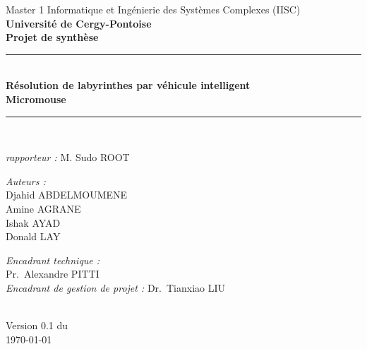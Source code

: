 \begin{titlepage}

\begin{center}

\AddToShipoutPicture*{\BackgroundPic}

{\large Master 1 Informatique et Ingénierie des Systèmes Complexes (IISC)}\\[0.5cm]

{\large \textbf{Université de Cergy-Pontoise}}\\[1.5cm]

{\large \textbf{Projet de synthèse}}\\[0.5cm]

\rule{\linewidth}{0.5mm} \\[0.4cm]
{ 
    \huge \bfseries Résolution de labyrinthes par véhicule intelligent \\[0.5cm]
    \huge Micromouse\\[0.4cm]
}
\rule{\linewidth}{0.5mm} \\[0.5cm]

\begin{center}
\begin{minipage}{0.5\textwidth}
   \large
    \emph{rapporteur :}
    M. Sudo \textsc{ROOT}
\end{minipage}%
\end{center}

\vspace{5mm}
\noindent
\begin{minipage}{0.5\textwidth}
  \begin{flushleft} \large
    \emph{Auteurs :}\\
    Djahid \textsc{ABDELMOUMENE}\\
    Amine \textsc{AGRANE}\\
    Ishak \textsc{AYAD}\\
    Donald \textsc{LAY}
  \end{flushleft}
\end{minipage}%
\begin{minipage}{0.5\textwidth}
  \begin{flushright} \large
    \emph{Encadrant technique :} \\
    Pr.~Alexandre \textsc{PITTI}\\
    \emph{Encadrant de gestion de projet :}
    Dr.~Tianxiao \textsc{LIU}
  \end{flushright}
\end{minipage}

 \\

\vspace*{\fill}
{\large Version 0.1 du\\ \today}

\end{center}
\end{titlepage}